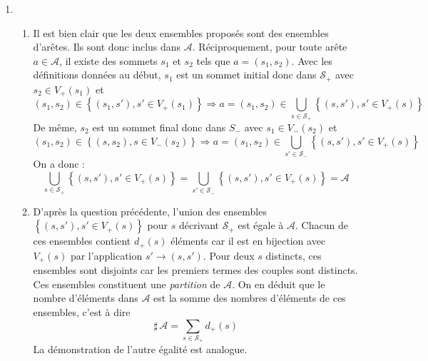 \begin{enumerate}
 \item 
\begin{enumerate}
 \item Il est bien clair que les deux ensembles proposés sont des ensembles d'arêtes. Ils sont donc inclus dans $\mathcal{A}$.\newline
Réciproquement, pour toute arête $a\in \mathcal A$, il existe des sommets $s_1$ et $s_2$ tels que $a=(s_1,s_2)$. Avec les définitions données au début, $s_1$ est un sommet initial donc dans $\mathcal S_+$ avec $s_2\in V_+(s_1)$ et 
\begin{displaymath}
(s_1,s_2)\in \left\lbrace (s_1,s'),s'\in V_+(s_1)\right\rbrace
\Rightarrow
a=(s_1,s_2)\in \bigcup_{s\in \mathcal S_+} \left\lbrace (s,s'),s'\in V_+(s)\right\rbrace
\end{displaymath}
De même, $s_2$ est un sommet final donc dans $S_-$ avec $s_1\in V_-(s_2)$ et
\begin{displaymath}
(s_1,s_2)\in \left\lbrace (s,s_2),s\in V_-(s_2)\right\rbrace
\Rightarrow
a=(s_1,s_2)\in \bigcup_{s'\in \mathcal S_-} \left\lbrace (s,s'),s'\in V_+(s)\right\rbrace
\end{displaymath}
On a donc :
\begin{displaymath}
 \bigcup_{s\in \mathcal S_+} \left\lbrace (s,s'),s'\in V_+(s)\right\rbrace
=
\bigcup_{s'\in \mathcal S_-} \left\lbrace (s,s'),s'\in V_+(s)\right\rbrace
= \mathcal A
\end{displaymath}

 \item D'après la question précédente, l'union des ensembles $\left\lbrace (s,s'),s'\in V_+(s)\right\rbrace$ pour $s$ décrivant $\mathcal S_+$ est égale à $\mathcal A$.\newline
 Chacun de ces ensembles contient $d_+(s)$ éléments car il est en bijection avec $V_+(s)$ par l'application $s'\rightarrow (s,s')$.\newline
Pour deux $s$ distincts, ces ensembles sont disjoints car les premiers termes des couples sont distincts.\newline
Ces ensembles constituent une \emph{partition} de $\mathcal A$. On en déduit que le nombre d'éléments dans $\mathcal A$ est la somme des nombres d'éléments de ces ensembles, c'est à dire
\begin{displaymath}
 \sharp\, \mathcal A = \sum _{s\in \mathcal S_+}d_+(s)
\end{displaymath}
 La démonstration de l'autre égalité est analogue.
\end{enumerate}


\end{enumerate}

